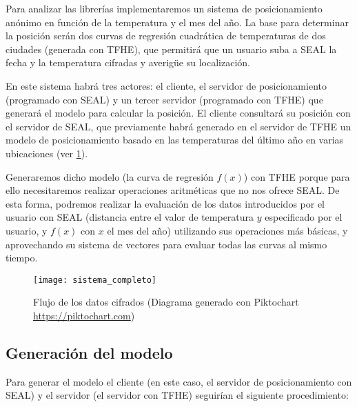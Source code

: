 Para analizar las librerías implementaremos un sistema de posicionamiento anónimo en función de la temperatura y el mes del año. La base para determinar la posición serán dos curvas de regresión cuadrática de temperaturas de dos ciudades (generada con TFHE), que permitirá que un usuario suba a SEAL la fecha y la temperatura cifradas y averigüe su localización.

En este sistema habrá tres actores: el cliente, el servidor de posicionamiento (programado con SEAL) y un tercer servidor (programado con TFHE) que generará el modelo para calcular la posición. El cliente consultará su posición con el servidor de SEAL, que previamente habrá generado en el servidor de TFHE un modelo de posicionamiento basado en las temperaturas del último año en varias ubicaciones (ver \ref{fig:sistema_completo}).

Generaremos dicho modelo (la curva de regresión $f(x)$) con TFHE porque para ello necesitaremos realizar operaciones aritméticas que no nos ofrece SEAL. De esta forma, podremos realizar la evaluación de los datos introducidos por el usuario con SEAL (distancia entre el valor de temperatura $y$ especificado por el usuario, y $f(x)$ con $x$ el mes del año) utilizando sus operaciones más básicas, y aprovechando su sistema de vectores para evaluar todas las curvas al mismo tiempo.

\begin{figure}[h]
    \texttt{[image: sistema\_completo]}
    \caption{Flujo de los datos cifrados (Diagrama generado con Piktochart \url{https://piktochart.com})}
    \label{fig:sistema_completo}
\end{figure}

\subsection{Generación del modelo}

Para generar el modelo el cliente (en este caso, el servidor de posicionamiento con SEAL) y el servidor (el servidor con TFHE) seguirían el siguiente procedimiento:


